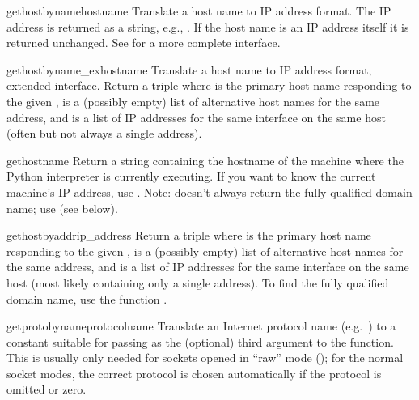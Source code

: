 \begin{funcdesc}{gethostbyname}{hostname}
Translate a host name to IP address format.  The IP address is
returned as a string, e.g.,  .  If the host name
is an IP address itself it is returned unchanged.  See
 for a more complete interface.
\end{funcdesc}

\begin{funcdesc}{gethostbyname_ex}{hostname}
Translate a host name to IP address format, extended interface.
Return a triple  where
 is the primary host name responding to the given
,  is a (possibly empty) list of
alternative host names for the same address, and  is
a list of IP addresses for the same interface on the same
host (often but not always a single address).
\end{funcdesc}

\begin{funcdesc}{gethostname}{}
Return a string containing the hostname of the machine where 
the Python interpreter is currently executing.  If you want to know the
current machine's IP address, use .
Note:  doesn't always return the fully qualified
domain name; use 
(see below).
\end{funcdesc}

\begin{funcdesc}{gethostbyaddr}{ip_address}
Return a triple  where  is the primary host name
responding to the given ,  is a
(possibly empty) list of alternative host names for the same address,
and  is a list of IP addresses for the same interface
on the same host (most likely containing only a single address).
To find the fully qualified domain name, use the function
.
\end{funcdesc}

\begin{funcdesc}{getprotobyname}{protocolname}
Translate an Internet protocol name (e.g.\ ) to a constant
suitable for passing as the (optional) third argument to the
 function.  This is usually only needed for sockets
opened in ``raw'' mode (); for the normal socket
modes, the correct protocol is chosen automatically if the protocol is
omitted or zero.
\end{funcdesc}

